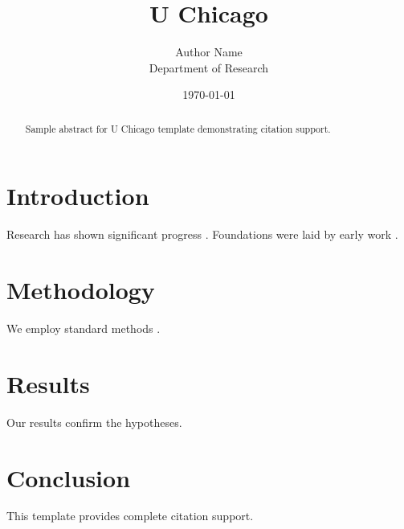 \documentclass{thesis_chicago}
\title{U Chicago}
\author{Author Name \\ \small Department of Research}
\date{\today}
\begin{document}
\maketitle

\begin{abstract}
Sample abstract for U Chicago template demonstrating citation support.
\end{abstract}

\section{Introduction}
Research has shown significant progress \citep{einstein1905}. Foundations were laid by early work \citep{turing1950}.

\section{Methodology}
We employ standard methods \citep{knuth1984}.

\section{Results}
Our results confirm the hypotheses.

\section{Conclusion}
This template provides complete citation support.



\end{document}

